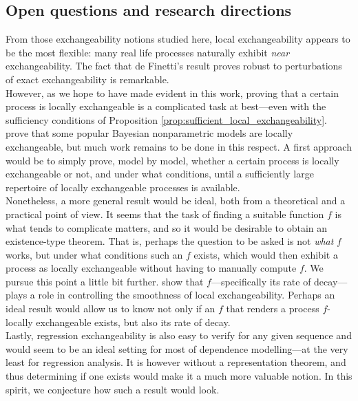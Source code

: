 \subsection{Open questions and research directions}


From those exchangeability notions studied here, local exchangeability appears to be the most flexible: many real life processes naturally exhibit \textit{near} exchangeability. The fact that de Finetti's result proves robust to perturbations of exact exchangeability is remarkable. 
\\


However, as we hope to have made evident in this work, proving that a certain process is locally exchangeable is a complicated task at best---even with the sufficiency conditions of Proposition \ref{prop:sufficient_local_exchangeability}. \cite{CampbellEtAl:2019:LocalExch} prove that some popular Bayesian nonparametric models are locally exchangeable, but much work remains to be done in this respect. A first approach would be to simply prove, model by model, whether a certain process is locally exchangeable or not, and under what conditions, until a sufficiently large repertoire of locally exchangeable processes is available. 
\\

Nonetheless, a more general result would be ideal, both from a theoretical and a practical point of view. It seems that the task of finding a suitable function $f$ is what tends to complicate matters, and so it would be desirable to obtain an existence-type theorem. That is, perhaps the question to be asked is not \textit{what} $f$ works, but under what conditions such an $f$ exists, which would then exhibit a process as locally exchangeable without having to manually compute $f$. We pursue this point a little bit further. \cite{CampbellEtAl:2019:LocalExch} show that $f$---specifically its rate of decay---plays a role in controlling the smoothness of local exchangeability. Perhaps an ideal result would allow us to know not only if an $f$ that renders a process $f$-locally exchangeable exists, but also its rate of decay.
\\


Lastly, regression exchangeability is also easy to verify for any given sequence and would seem to be an ideal setting for most of dependence modelling---at the very least for regression analysis. It is however without a representation theorem, and thus determining if one exists would make it a much more valuable notion. In this spirit, we conjecture how such a result would look.
\\


